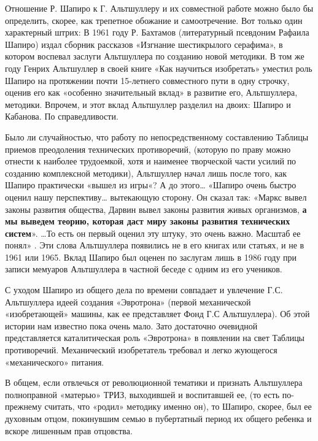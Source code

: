 \documentclass[11pt,a4paper]{article}
\begin{document}
Отношение Р. Шапиро к Г. Альтшуллеру и их совместной работе можно было бы
определить, скорее, как трепетное обожание и самоотречение. Вот только один
характерный штрих: В 1961 году Р. Бахтамов (литературный псевдоним Рафаила
Шапиро) издал сборник рассказов «Изгнание шестикрылого серафима», в котором
воспевал заслуги Альтшуллера по созданию новой методики. В том же году Генрих
Альтшуллер в своей книге «Как научиться изобретать» уместил роль Шапиро на
протяжении почти 15-летнего совместного пути в одну строчку, оценив его как
«особенно значительный вклад» в развитие его, Альтшуллера, методики. Впрочем,
и этот вклад Альтшуллер разделил на двоих: Шапиро и Кабанова. По
справедливости.

Было ли случайностью, что работу по непосредственному составлению Таблицы
приемов преодоления технических противоречий, (которую по праву можно отнести
к наиболее трудоемкой, хотя и наименее творческой части усилий по созданию
комплексной методики), Альтшуллер начал лишь после того, как Шапиро
практически «вышел из игры«? А до этого… «Шапиро очень быстро оценил нашу
перспективу… вытекающую сторону. Он сказал так: «Маркс вывел законы развития
общества, Дарвин вывел законы развития живых организмов, \textbf{а мы выведем
  теорию, которая даст миру законы развития технических систем}». …То есть он
первый оценил эту штуку, это очень важно. Масштаб ее понял»
\cite{Altshuller1986}.  Эти слова Альтшуллера появились не в его книгах или
статьях, и не в 1961 или 1965. Вклад Шапиро был оценен по заслугам лишь в 1986
году при записи мемуаров Альтшуллера в частной беседе с одним из его учеников.

С уходом Шапиро из общего дела по времени совпадает и увлечение
Г.С. Альтшуллера идеей создания «Эвротрона» (первой механической
«изобретающей» машины, как ее представляет Фонд Г.С Альтшуллера). Об этой
истории нам известно пока очень мало. Зато достаточно очевидной представляется
каталитическая роль «Эвротрона» в появлении на свет Таблицы
противоречий. Механический изобретатель требовал и легко жующегося
«механического» питания.

В общем, если отвлечься от революционной тематики и признать Альтшуллера
полноправной «матерью» ТРИЗ, выходившей и воспитавшей ее, (то есть по-прежнему
считать, что «родил» методику именно он), то Шапиро, скорее, был ее духовным
отцом, покинувшим семью в пубертатный период их общего ребенка и вскоре
лишенным прав отцовства.
\end{document}
